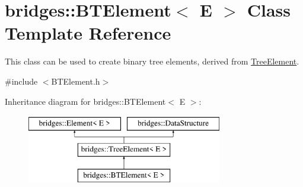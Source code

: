 \hypertarget{classbridges_1_1_b_t_element}{}\section{bridges\+::B\+T\+Element$<$ E $>$ Class Template Reference}
\label{classbridges_1_1_b_t_element}


This class can be used to create binary tree elements, derived from \mbox{\hyperlink{classbridges_1_1_tree_element}{Tree\+Element}}.  




{\ttfamily \#include $<$B\+T\+Element.\+h$>$}

Inheritance diagram for bridges\+::B\+T\+Element$<$ E $>$\+:\begin{figure}[H]
\begin{center}
\leavevmode
\includegraphics[height=3.000000cm]{classbridges_1_1_b_t_element}
\end{center}
\end{figure}
